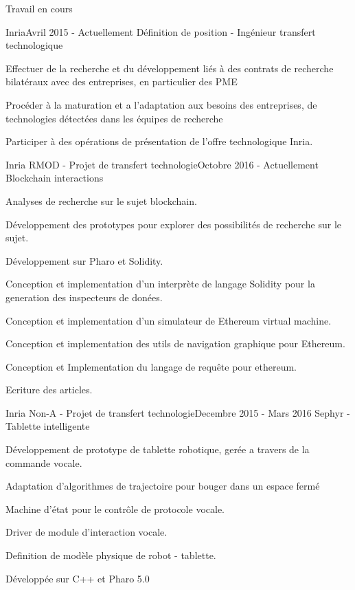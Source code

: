 \documentclass{resume} %
\begin{document}
\begin{rSection}{Travail en cours}
	\begin{rSubsection}{Inria}{Avril 2015 - Actuellement }{D\'efinition de position - Ing\'{e}nieur transfert technologique}
		\item 
		\item Effectuer de la recherche et du d\'{e}veloppement li\'{e}s \`a des contrats de recherche bilat\'{e}raux avec des entreprises, en particulier des PME 
		\item Proc\'{e}der \`a la maturation et  a  l'adaptation aux besoins des entreprises, de technologies d\'{e}tect\'{e}es dans les \'{e}quipes de recherche 
		\item Participer  \`a  des op\'{e}rations de pr\'{e}sentation de l'offre technologique Inria. 
	\end{rSubsection}
	
	\begin{rSubsection}{Inria RMOD - Projet de transfert technologie}{Octobre 2016 - Actuellement }{Blockchain interactions}
		\item 
		\item Analyses de recherche sur le sujet blockchain. 
		\item D\'{e}veloppement des prototypes pour explorer des possibilit\'{e}s de recherche sur le sujet.
		\item D\'{e}veloppement sur Pharo et Solidity. 
		\item Conception et implementation d'un interpr\`{e}te de langage Solidity pour la generation des inspecteurs de don\'{e}es.
		\item Conception et implementation d'un simulateur de Ethereum virtual machine. 
		\item Conception et implementation des utils de navigation graphique pour Ethereum. 
		\item Conception et Implementation du langage de requ\^{e}te pour ethereum. 
		\item Ecriture des articles.
	\end{rSubsection}
	
	\begin{rSubsection}{Inria Non-A - Projet de transfert technologie}{Decembre 2015 - Mars 2016 }{Sephyr - Tablette intelligente }
		\item 
		\item D\'{e}veloppement de prototype de tablette robotique, ger\'{e}e a travers de la commande vocale. 
		\item Adaptation d'algorithmes de trajectoire pour bouger dans un espace ferm\'{e}
		\item Machine d'\'{e}tat pour le contr\^ole de protocole vocale. 
		\item Driver de module d'interaction vocale.  
		\item Definition de mod\`ele physique de robot - tablette. 
		\item D\'{e}velopp\'{e}e sur C++ et Pharo 5.0
	\end{rSubsection}
	

\end{rSection}
\end{document}

